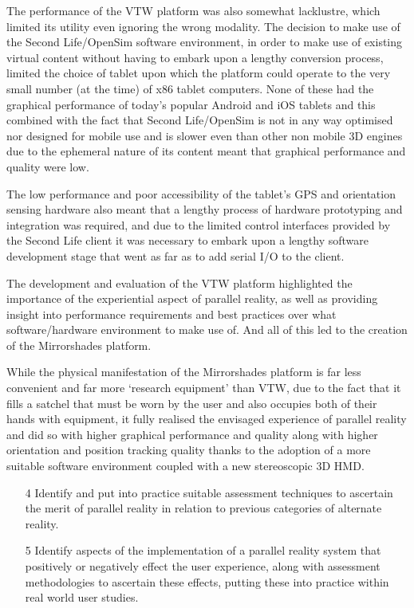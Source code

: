 The performance of the VTW platform was also somewhat lacklustre, which limited its utility even ignoring the wrong modality. The decision to make use of the Second Life/OpenSim software environment, in order to make use of existing virtual content without having to embark upon a lengthy conversion process, limited the choice of tablet upon which the platform could operate to the very small number (at the time) of x86 tablet computers. None of these had the graphical performance of today's popular Android and iOS tablets and this combined with the fact that Second Life/OpenSim is not in any way optimised nor designed for mobile use and is slower even than other non mobile 3D engines due to the ephemeral nature of its content meant that graphical performance and quality were low.

The low performance and poor accessibility of the tablet's GPS and orientation sensing hardware also meant that a lengthy process of hardware prototyping and integration was required, and due to the limited control interfaces provided by the Second Life client it was necessary to embark upon a lengthy software development stage that went as far as to add serial I/O to the client.


The development and evaluation of the VTW platform highlighted the importance of the experiential aspect of parallel reality, as well as providing insight into performance requirements and best practices over what software/hardware environment to make use of. And all of this led to the creation of the Mirrorshades platform.

While the physical manifestation of the Mirrorshades platform is far less convenient and far more `research equipment' than VTW, due to the fact that it fills a satchel that must be worn by the user and also occupies both of their hands with equipment, it fully realised the envisaged experience of parallel reality and did so with higher graphical performance and quality along with higher orientation and position tracking quality thanks to the adoption of a more suitable software environment coupled with a new stereoscopic 3D HMD.

\begin{enumerate}	
	\item[4] Identify and put into practice suitable assessment techniques to ascertain the merit of parallel reality in relation to previous categories of alternate reality.
	\item[5] Identify aspects of the implementation of a parallel reality system that positively or negatively effect the user experience, along with assessment methodologies to ascertain these effects, putting these into practice within real world user studies.
\end{enumerate}

